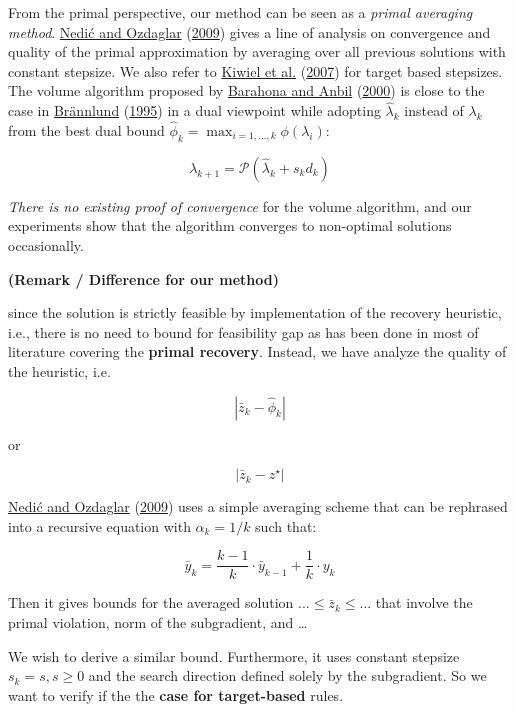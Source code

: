 \documentclass[
  a4paper,
,tablecaptionabove
]{scrartcl}
\numberwithin{equation}{section}
\begin{document}
From the primal perspective, our method can be seen as a \emph{primal
  averaging method}. \protect\hyperlink{ref-nedic_approximate_2009}{Nedić
  and Ozdaglar} (\protect\hyperlink{ref-nedic_approximate_2009}{2009})
gives a line of analysis on convergence and quality of the primal
approximation by averaging over all previous solutions with constant
stepsize. We also refer to
\protect\hyperlink{ref-kiwiel_lagrangian_2007}{Kiwiel et al.}
(\protect\hyperlink{ref-kiwiel_lagrangian_2007}{2007}) for target based
stepsizes. The volume algorithm proposed by
\protect\hyperlink{ref-barahona_volume_2000}{Barahona and Anbil}
(\protect\hyperlink{ref-barahona_volume_2000}{2000}) is close to the
case in \protect\hyperlink{ref-brannlund1995generalized}{Brännlund}
(\protect\hyperlink{ref-brannlund1995generalized}{1995}) in a dual
viewpoint while adopting \(\hat \lambda_{k}\) instead of \(\lambda_k\)
from the best dual bound
\(\hat \phi_k = \max_{i=1, ..., k} \phi(\lambda_i)\):

\[\lambda_{k+1} = \mathcal{P}(\hat\lambda_{k} + s_{k}d_{k})\]

\emph{There is no existing proof of convergence} for the volume
algorithm, and our experiments show that the algorithm converges to
non-optimal solutions occasionally.

\textbf{(Remark / Difference for our method)}

since the solution is strictly feasible by implementation of the
recovery heuristic, i.e., there is no need to bound for feasibility gap
as has been done in most of literature covering the \textbf{primal
  recovery}. Instead, we have analyze the quality of the heuristic, i.e.~

\[
  |\bar z_k -\hat \phi_k|
\]

or

\[
  |\bar z_k - z^\star|
\]

\protect\hyperlink{ref-nedic_approximate_2009}{Nedić and Ozdaglar}
(\protect\hyperlink{ref-nedic_approximate_2009}{2009}) uses a simple
averaging scheme that can be rephrased into a recursive equation with
\(\alpha_k = 1/k\) such that:

\[\bar y_k = \frac{k-1}{k}\cdot\bar y_{k-1} + \frac{1}{k} \cdot y_k\]

Then it gives bounds for the averaged solution \(...\le\bar z_k\le ...\)
that involve the primal violation, norm of the subgradient, and \ldots{}

We wish to derive a similar bound. Furthermore, it uses constant
stepsize \(s_k = s, s\ge 0\) and the search direction defined solely by
the subgradient. So we want to verify if the the \textbf{case for
  target-based} rules.
\end{document}
